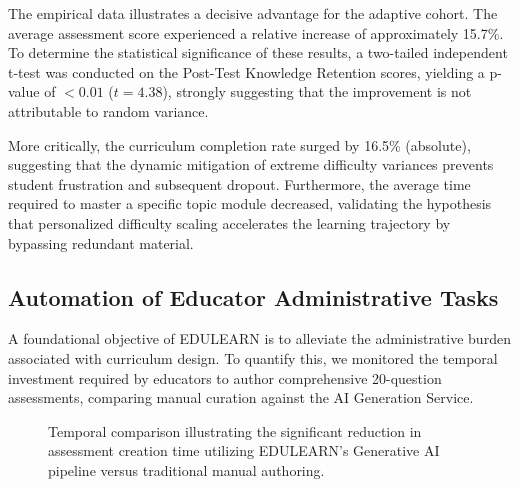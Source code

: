 \documentclass[conference]{IEEEtran}
\begin{document}
The empirical data illustrates a decisive advantage for the adaptive cohort. The average assessment score experienced a relative increase of approximately 15.7\%. To determine the statistical significance of these results, a two-tailed independent t-test was conducted on the Post-Test Knowledge Retention scores, yielding a p-value of $< 0.01$ ($t = 4.38$), strongly suggesting that the improvement is not attributable to random variance. 

More critically, the curriculum completion rate surged by 16.5\% (absolute), suggesting that the dynamic mitigation of extreme difficulty variances prevents student frustration and subsequent dropout. Furthermore, the average time required to master a specific topic module decreased, validating the hypothesis that personalized difficulty scaling accelerates the learning trajectory by bypassing redundant material.

\subsection{Automation of Educator Administrative Tasks}
A foundational objective of EDULEARN is to alleviate the administrative burden associated with curriculum design. To quantify this, we monitored the temporal investment required by educators to author comprehensive 20-question assessments, comparing manual curation against the AI Generation Service.

\begin{figure}[htbp]
\centering
{}
\caption{Temporal comparison illustrating the significant reduction in assessment creation time utilizing EDULEARN's Generative AI pipeline versus traditional manual authoring.}
\label{fig:educator_time}
\end{figure}
\end{document}
